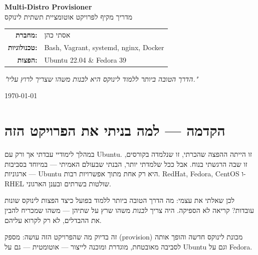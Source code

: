 \documentclass[12pt,a4paper]{article}
\begin{document}

\begin{titlepage}
\centering
\vspace*{2cm}

{\Huge\bfseries\color{sectionblue} Multi-Distro Provisioner}\\[0.5cm]
{\Large מדריך מקיף לפרויקט אוטומציית תשתית לינוקס}\\[2cm]

{\large
\begin{tabular}{rl}
\textbf{מחברת:} & אסתי כהן \\[0.3cm]
\textbf{טכנולוגיות:} & Bash, Vagrant, systemd, nginx, Docker \\[0.3cm]
\textbf{הפצות:} & Ubuntu 22.04 \& Fedora 39 \\[0.3cm]
\end{tabular}
}

\vspace{2cm}

\begin{infobox}
\centering
\textit{"הדרך הטובה ביותר ללמוד לינוקס היא לבנות משהו שצריך לרוץ עליו."}
\end{infobox}

\vfill
{\small \today}
\end{titlepage}

\tableofcontents
\newpage

\section{הקדמה — למה בניתי את הפרויקט הזה}

במהלך לימודיי עבדתי אך ורק עם Ubuntu. זו הייתה ההפצה שהכרתי, זו שנלמדה בקורסים, זו שבה הרגשתי בנוח. אבל ככל שלמדתי יותר, הבנתי שבעולם האמיתי — במיוחד בסביבות ארגוניות — Ubuntu היא רק אחת מתוך אפשרויות רבות. RedHat, Fedora, CentOS ו-RHEL שולטות בשרתים ובענן הארגוני.

לכן שאלתי את עצמי: מה הדרך הטובה ביותר ללמוד בפועל כיצד הפצות לינוקס שונות עובדות? קריאה לא הספיקה. היה צריך \textit{לבנות} משהו שרץ על שתיהן — משהו שמכריח להבין את ההבדלים, לא רק לקרוא עליהם.

זה בדיוק מה שהפרויקט הזה עושה: מספק (provision) מכונת לינוקס חדשה והופך אותה לסביבה מאובטחת, מוגדרת ומוכנה לייצור — אוטומטית — גם על Ubuntu וגם על Fedora.
\end{document}
